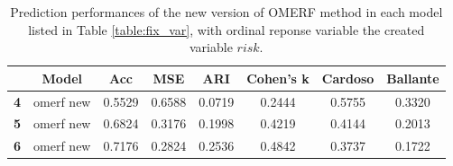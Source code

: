 \begin{table}[H]
    \centering 
    \begin{tabular}{|p{1em} c c c c c c c |}
    \hline
    \rowcolor{bluePoli!40}
    & \textbf{Model} & \textbf{Acc} & \textbf{MSE} & \textbf{ARI} & \textbf{Cohen's k} & \textbf{Cardoso} & \textbf{Ballante} \T\B \\
    \hline \hline
    \textbf{4} & omerf new & 0.5529 & 0.6588 &  0.0719 & 0.2444 & 0.5755 & 0.3320 \T\B \\
    \hline
    \textbf{5} & omerf new & 0.6824 & 0.3176 & 0.1998 & 0.4219 & 0.4144 & 0.2013 \T\B \\
    \hline
    \textbf{6} & omerf new & 0.7176 & 0.2824 & 0.2536 & 0.4842 & 0.3737 & 0.1722 \B \\
    \hline
    \end{tabular}
    \\[10pt]
    \caption{Prediction performances of the new version of OMERF method in each model listed in Table \ref{table:fix_var}, with ordinal reponse variable the created variable \(risk\).}
    \label{table:omerf2}
\end{table}



